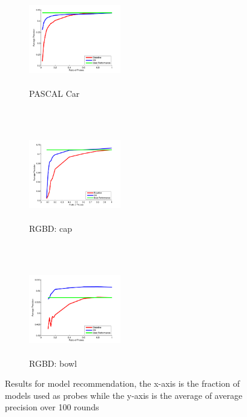 \documentclass{article} %
\begin{document}
\begin{figure}
        \begin{subfigure}[b]{0.3\textwidth}
                \centering
                \includegraphics[width=4cm,height=4cm]{fig/pascalcarpure.pdf}
                \caption{PASCAL Car}
                \label{curve:PASCALCAR}
        \end{subfigure}
        ~
        \begin{subfigure}[b]{0.3\textwidth}
                \centering
                \includegraphics[width=4cm,height=4cm]{fig/cap4pure.pdf}
                \caption{RGBD: cap}
                \label{curve:RGBDcap}
        \end{subfigure}
        ~
        \begin{subfigure}[b]{0.3\textwidth}
                \centering
                \includegraphics[width=4cm,height=4cm]{fig/bowl4pure.pdf}
                \caption{RGBD: bowl}
                \label{curve:RGBDbowl}
        \end{subfigure}
        \caption{Results for model recommendation, the x-axis is the fraction of models used as probes while the y-axis is the average of average precision over 100 rounds}\label{curve}
\end{figure}
\end{document}
